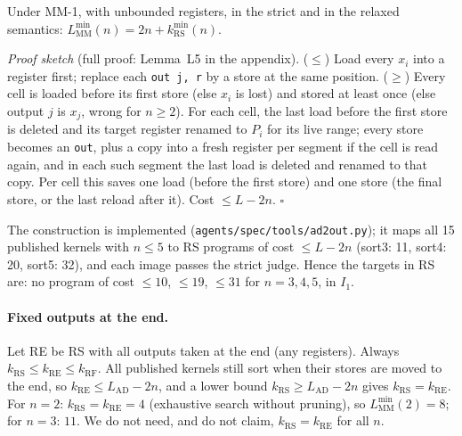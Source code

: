 \begin{lemma}\label{lem:snapshot}
Under MM-1, with unbounded registers, in the strict and in the relaxed semantics: $L^{\min}_{\mathrm{MM}}(n) = 2n +
k^{\min}_{\mathrm{RS}}(n)$.
\end{lemma}
\noindent\emph{Proof sketch} (full proof: Lemma~L5 in the appendix). ($\le$) Load every $x_i$ into a register first; replace
each \texttt{out j, r} by a store at the same position. ($\ge$) Every cell is loaded before its first store (else $x_i$ is
lost) and stored at least once (else output $j$ is $x_j$, wrong for $n \ge 2$). For each cell, the last load before the first
store is deleted and its target register renamed to $P_i$ for its live range; every store becomes an \texttt{out}, plus a copy
into a fresh register per segment if the cell is read again, and in each such segment the last load is deleted and renamed to
that copy. Per cell this saves one load (before the first store) and one store (the final store, or the last reload after it).
Cost $\le L - 2n$. $\square$

\noindent The construction is implemented (\texttt{agents/spec/tools/ad2out.py}); it maps all 15 published kernels with
$n \le 5$ to RS programs of cost $\le L - 2n$ (sort3: 11, sort4: 20, sort5: 32), and each image passes the strict judge.
Hence the targets in RS are: no program of cost $\le 10$, $\le 19$, $\le 31$ for $n = 3, 4, 5$, in $I_1$.

\paragraph{Fixed outputs at the end.} Let RE be RS with all outputs taken at the end (any registers). Always
$k_{\mathrm{RS}} \le k_{\mathrm{RE}} \le k_{\mathrm{RF}}$. All published kernels still sort when their stores are moved to
the end, so $k_{\mathrm{RE}} \le L_{\mathrm{AD}} - 2n$, and a lower bound $k_{\mathrm{RS}} \ge L_{\mathrm{AD}} - 2n$ gives
$k_{\mathrm{RS}} = k_{\mathrm{RE}}$. For $n = 2$: $k_{\mathrm{RS}} = k_{\mathrm{RE}} = 4$ (exhaustive search without
pruning), so $L^{\min}_{\mathrm{MM}}(2) = 8$; for $n = 3$: $11$. We do not need, and do not claim, $k_{\mathrm{RS}} =
k_{\mathrm{RE}}$ for all $n$.

